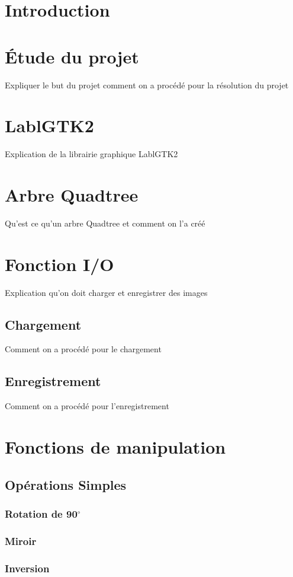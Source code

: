 \documentclass[12pt]{article}
\begin{document}

\section*{Introduction}
\section{Étude du projet}
Expliquer le but du projet comment on a procédé pour la résolution du projet
\section{LablGTK2}
Explication de la librairie graphique LablGTK2
\section{Arbre Quadtree}
Qu'est ce qu'un arbre Quadtree et comment on l'a créé
\section{Fonction I/O}
Explication qu'on doit charger et enregistrer des images
\subsection{Chargement}
Comment on a procédé pour le chargement
\subsection{Enregistrement}
Comment on a procédé pour l'enregistrement
\section{Fonctions de manipulation}
\subsection{Opérations Simples}
\subsubsection{Rotation de 90$^{\circ}$}
\subsubsection{Miroir}
\subsubsection{Inversion}
\end{document}
